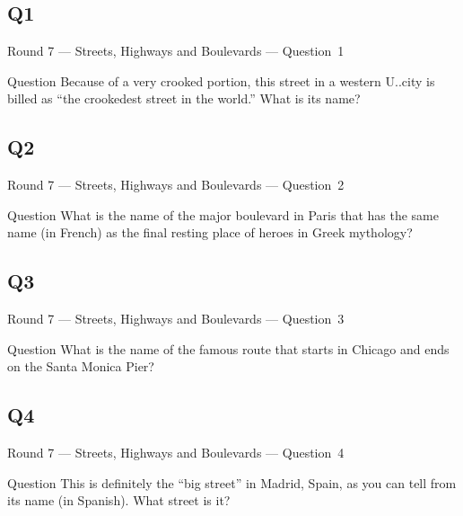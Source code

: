 \documentclass[11pt]{beamer}
\begin{document}
\subsection*{Q1}
\begin{frame}[t]{Round 7 --- Streets, Highways and Boulevards --- \mbox{Question 1}}
\vspace{-0.5em}
\begin{block}{Question}
Because of a very crooked portion, this street in a western U.\@S.\@ city is billed as ``the crookedest street in the world.'' What is its name?
\end{block}
\end{frame}
\subsection*{Q2}
\begin{frame}[t]{Round 7 --- Streets, Highways and Boulevards --- \mbox{Question 2}}
\vspace{-0.5em}
\begin{block}{Question}
What is the name of the major boulevard in Paris that has the same name (in French) as the final resting place of heroes in Greek mythology?
\end{block}
\end{frame}
\subsection*{Q3}
\begin{frame}[t]{Round 7 --- Streets, Highways and Boulevards --- \mbox{Question 3}}
\vspace{-0.5em}
\begin{block}{Question}
What is the name of the  famous route that starts in Chicago and ends on the Santa Monica Pier?
\end{block}
\end{frame}
\subsection*{Q4}
\begin{frame}[t]{Round 7 --- Streets, Highways and Boulevards --- \mbox{Question 4}}
\vspace{-0.5em}
\begin{block}{Question}
This is definitely the ``big street'' in Madrid, Spain, as you can tell from its name (in Spanish). What street is it?
\end{block}
\end{frame}
\end{document}
